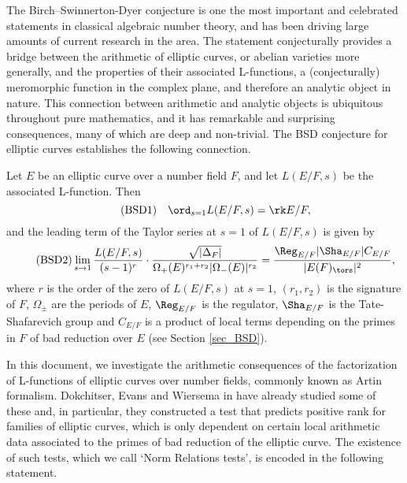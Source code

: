 The Birch--Swinnerton-Dyer conjecture is one the most important and celebrated statements in classical algebraic number theory, and has been driving large amounts of current research in the area. The statement conjecturally provides a bridge between the arithmetic of elliptic curves, or abelian varieties more generally, and the properties of their associated L-functions, a (conjecturally) meromorphic function in the complex plane, and therefore an analytic object in nature. This connection between arithmetic and analytic objects is ubiquitous throughout pure mathematics, and it has remarkable and surprising consequences, many of which are deep and non-trivial. The BSD conjecture for elliptic curves establishes the following connection.

\begin{conj}
    Let $E$ be an elliptic curve over a number field $F$, and let $L(E/F,s)$ be the associated L-function. Then
    \begin{equation}\label{eqn_BSD1}\tag{BSD1}
        \quad\ord_{s=1}L(E/F,s)=\rk E/F,
    \end{equation}
    and the leading term of the Taylor series at $s=1$ of $L(E/F,s)$ is given by
    \begin{equation}\label{eqn_BSD2}\tag{BSD2}
        \lim_{s\to1}\frac{L(E/F,s)}{(s-1)^r}\cdot\frac{\sqrt{|\Delta_F|}}{\Omega_+(E)^{r_1+r_2}|\Omega_-(E)|^{r_2}}=\frac{\Reg_{E/F}|\Sha_{E/F}|C_{E/F}}{|E(F)_{\tors}|^2},
    \end{equation}
    where $r$ is the order of the zero of $L(E/F,s)$ at $s=1$, $(r_1,r_2)$ is the signature of $F$, $\Omega_{\pm}$ are the periods of $E$, $\Reg_{E/F}$ is the regulator, $\Sha_{E/F}$ is the Tate-Shafarevich group and $C_{E/F}$ is a product of local terms depending on the primes in $F$ of bad reduction over $E$ (see Section \ref{sec_BSD}).
\end{conj}

In this document, we investigate the arithmetic consequences of the factorization of L-functions of elliptic curves over number fields, commonly known as Artin formalism. Dokchitser, Evans and Wiersema in \cite{DEW1} have already studied some of these and, in particular, they constructed a test that predicts positive rank for families of elliptic curves, which is only dependent on certain local arithmetic data associated to the primes of bad reduction of the elliptic curve. The existence of such tests, which we call `Norm Relations tests', is encoded in the following statement. 

